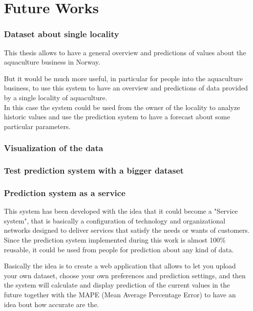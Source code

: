 \newpage


	
	




\part{Future Works}
\section{Dataset about single locality}
This thesis allows to have a general overview and predictions of values about the aquaculture business in Norway. 

But it would be much more useful, in particular for people into the aquaculture business, to use this system to have an overview and predictions of data provided by a single locality of aquaculture.\\
In this case the system could be used from the owner of the locality to analyze historic values and use the prediction system to have a forecast about some particular parameters.

\section{Visualization of the data}

\section{Test prediction system with a bigger dataset}

\newpage

\section{Prediction system as a service}
This system has been developed with the idea that it could become a "Service system", that is basically a configuration of technology and organizational networks designed to deliver services that satisfy the needs or wants of customers.
Since the prediction system implemented during this work is almost 100\% reusable, it could be used from people for prediction about any kind of data. 

Basically the idea is to create a web application that allows to let you upload your own dataset, choose your own preferences and prediction settings, and then the system will calculate and display prediction of the current values in the future together with the MAPE (Mean Average Percentage Error) to have an idea bout how accurate are the.\\



